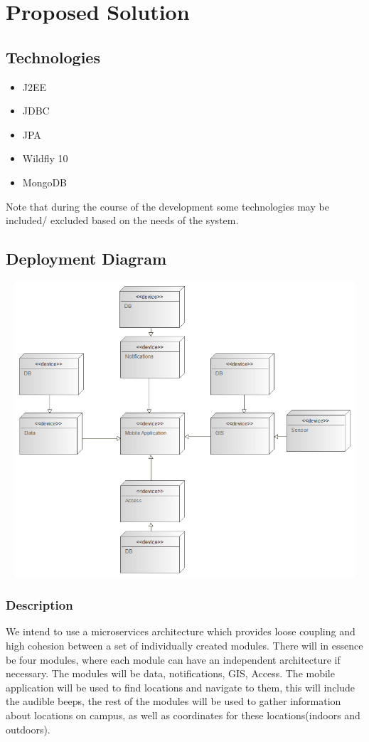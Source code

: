 \documentclass{article}
\begin{document}
\section{Proposed Solution}

\subsection{Technologies}
\begin{itemize}
	\item J2EE
	\item JDBC
	\item JPA
	\item Wildfly 10
	\item MongoDB
\end{itemize}
Note that during the course of the development some technologies may be included/ excluded based on the needs of the system.
\subsection{Deployment Diagram}
\includegraphics[width=20cm,height=11cm,keepaspectratio]{dd1.png} \\

\subsubsection{Description}
We intend to use a microservices architecture which provides loose coupling and high cohesion between a set of individually created modules. There will in essence be four modules, where each module can have an independent architecture if necessary. The modules will be data, notifications, GIS, Access. The mobile application will be used to find locations and navigate to them, this will include the audible beeps, the rest of the modules will be used to gather information about locations on campus, as well as coordinates for these locations(indoors and outdoors).
\end{document}
